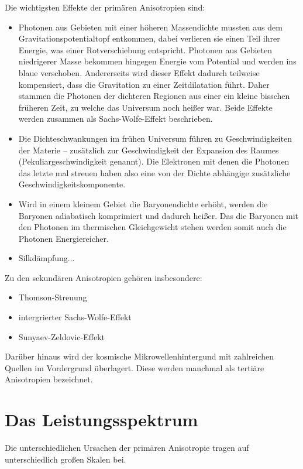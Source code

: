 \documentclass[10pt,a4paper]{article}
\begin{document}
Die wichtigsten Effekte der primären Anisotropien sind:
\begin{itemize}
\item Photonen aus Gebieten mit einer höheren Massendichte mussten aus dem Gravitationspotentialtopf entkommen, dabei verlieren sie einen Teil ihrer Energie, was einer Rotverschiebung entspricht. Photonen aus Gebieten niedrigerer Masse bekommen hingegen Energie vom Potential und werden ins blaue verschoben. Andererseits wird dieser Effekt dadurch teilweise kompensiert, dass die Gravitation zu einer Zeitdilatation führt. Daher stammen die Photonen der dichteren Regionen aus einer ein kleine bisschen früheren Zeit, zu welche das Universum noch heißer war. Beide Effekte werden zusammen als Sachs-Wolfe-Effekt beschrieben.
\item Die Dichteschwankungen im frühen Universum führen zu Geschwindigkeiten der Materie -- zusätzlich zur Geschwindigkeit der Expansion des Raumes (Pekuliargeschwindigkeit genannt). Die Elektronen mit denen die Photonen das letzte mal streuen haben also eine von der Dichte abhängige zusätzliche Geschwindigkeitskomponente. %
\item Wird in einem kleinem Gebiet die Baryonendichte erhöht, werden die Baryonen adiabatisch komprimiert und dadurch heißer. Das die Baryonen mit den Photonen im thermischen Gleichgewicht stehen werden somit auch die Photonen Energiereicher.
\item Silkdämpfung...
\end{itemize}

Zu den sekundären Anisotropien gehören insbesondere:
\begin{itemize}
\item Thomson-Streuung
\item intergrierter Sachs-Wolfe-Effekt
\item Sunyaev-Zeldovic-Effekt
\end{itemize}

Darüber hinaus wird der kosmische Mikrowellenhintergund mit zahlreichen Quellen im Vordergrund überlagert. Diese werden manchmal als tertiäre Anisotropien bezeichnet.

\section{Das Leistungsspektrum}
Die unterschiedlichen Ursachen der primären Anisotropie tragen auf unterschiedlich großen Skalen bei.
\end{document}
